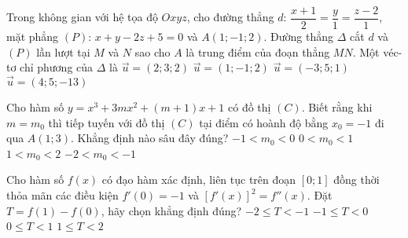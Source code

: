 \begin{ex}%
	Trong không gian với hệ tọa độ $Oxyz$, cho đường thẳng $d$: $\dfrac{x+1}{2}=\dfrac{y}{1}=\dfrac{z-2}{1}$, mặt phẳng $(P)$: $x+y-2z+5=0$ và $A\left(1;-1;2\right)$. Đường thẳng $\Delta $ cắt $d$ và $(P)$ lần lượt tại $M$ và $N$ sao cho $A$ là trung điểm của đoạn thẳng $MN$. Một véc-tơ chỉ phương của $\Delta $ là
	\choice
	{\True $\vec{u}=\left(2;3;2\right)$}
	{$\vec{u}=\left(1;-1;2\right)$}
	{$\vec{u}=\left(-3;5;1\right)$}
	{$\vec{u}=\left(4;5;-13\right)$}
\end{ex}
\begin{ex}%
	Cho hàm số $y=x^3+3mx^2+\left(m+1\right)x+1$ có đồ thị $(C)$. Biết rằng khi $m=m_0$ thì tiếp tuyến với đồ thị $(C)$ tại điểm có hoành độ bằng $x_0=-1$ đi qua $A\left(1;3\right)$. Khẳng định nào sâu đây đúng?
	\choice
	{$-1<m_0<0$}
	{\True $0<m_0<1$}
	{$1<m_0<2$}
	{$-2<m_0<-1$}
\end{ex}
\begin{ex}%
	Cho hàm số $f(x)$ có đạo hàm xác định, liên tục trên đoạn $\left[0;1\right]$ đồng thời thỏa mãn các điều kiện $f'(0)=-1$ và $\left[f'(x)\right]^2=f''(x)$. Đặt $T=f(1)-f(0)$, hãy chọn khẳng định đúng?
	\choice
	{$-2\le T<-1$}
	{\True $-1\le T<0$}
	{$0\le T<1$}
	{$1\le T<2$}
\end{ex}
